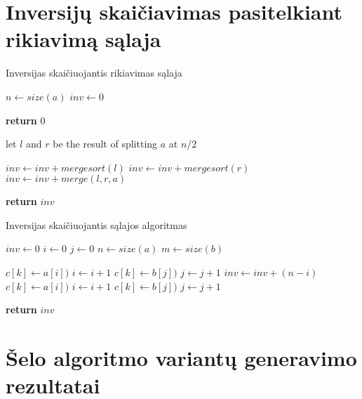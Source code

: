 \documentclass{VUMIFInfKursinis}
\begin{document}
\printbibliography[heading=bibintoc] %

\appendix  %

\section{Inversijų skaičiavimas pasitelkiant rikiavimą sąlaja}

\begin{algorithm}[H]
  \caption{Inversijas skaičiuojantis rikiavimas sąlaja}\label{alg:merge_sort}
  \begin{algorithmic}[1]
      \State $n \gets size(a)$
      \State $inv \gets 0$
      
        \State \textbf{return} $0$ 
      \EndIf

      \State let $l$ and $r$ be the result of splitting $a$ at $n/2$

      \State $inv \gets inv + mergesort(l)$
      \State $inv \gets inv + mergesort(r)$
      \State $inv \gets inv + merge(l,r,a)$

      \State \textbf{return} $inv$ 

    \EndProcedure
  \end{algorithmic}
\end{algorithm}

\begin{algorithm}[H]
  \caption{Inversijas skaičiuojantis sąlajos algoritmas}\label{alg:merge}
  \begin{algorithmic}[1]
      \State $inv \gets 0$
      \State $i \gets 0$
      \State $j \gets 0$
      \State $n \gets size(a)$
      \State $m \gets size(b)$
      
              \State $c[k] \gets a[i])$
              \State $i \gets i+1$
            \Else
              \State $c[k] \gets b[j])$
              \State $j \gets j+1$
              \State $inv \gets inv + (n-i)$
            \EndIf
          \Else
            \State $c[k] \gets a[i])$
            \State $i \gets i+1$
          \EndIf
        \Else
          \State $c[k] \gets b[j])$
          \State $j \gets j+1$
        \EndIf
      \EndFor

      \State \textbf{return} $inv$
      
    \EndProcedure
  \end{algorithmic}
\end{algorithm}

\section{Šelo algoritmo variantų generavimo rezultatai}
\end{document}
